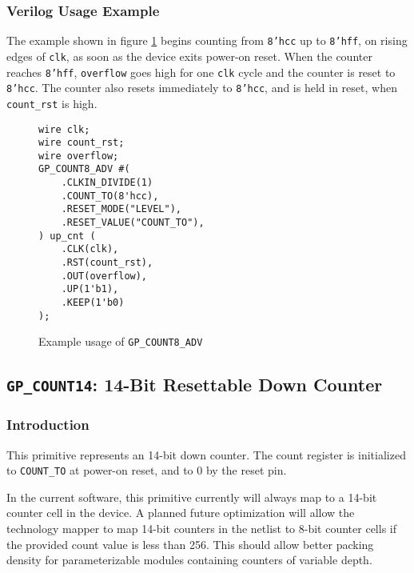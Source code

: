 \documentclass[11pt]{article}
\newcommand{\tokenstyle}[1]{\texttt{#1}}
\newcommand{\wirestyle}[1]{\texttt{#1}}
\newcommand{\datastyle}[1]{\texttt{#1}}
\begin{document}
\subsubsection{Verilog Usage Example}

The example shown in figure \ref{gp-count8-adv-example} begins counting from \datastyle{8'hcc} up to \datastyle{8'hff},
on rising edges of \wirestyle{clk}, as soon as the device exits power-on reset.
When the counter reaches \datastyle{8'hff}, \wirestyle{overflow} goes high for one \wirestyle{clk} cycle and
the counter is reset to \datastyle{8'hcc}. The counter also resets immediately to \datastyle{8'hcc}, and is held
in reset,  when \wirestyle{count\_rst} is high.

\begin{figure}[h]
\begin{lstlisting}
wire clk;
wire count_rst;
wire overflow;
GP_COUNT8_ADV #(
	.CLKIN_DIVIDE(1)
	.COUNT_TO(8'hcc),
	.RESET_MODE("LEVEL"),
	.RESET_VALUE("COUNT_TO"),
) up_cnt (
	.CLK(clk),
	.RST(count_rst),
	.OUT(overflow),
	.UP(1'b1),
	.KEEP(1'b0)
);
\end{lstlisting}
\caption{Example usage of \tokenstyle{GP\_COUNT8\_ADV}}
\label{gp-count8-adv-example}
\end{figure}


\pagebreak
\subsection{\tokenstyle{GP\_COUNT14}: 14-Bit Resettable Down Counter}
\label{gp-count14}

\subsubsection{Introduction}
This primitive represents an 14-bit down counter. The count register is initialized to \tokenstyle{COUNT\_TO} at
power-on reset, and to 0 by the reset pin.

In the current software, this primitive currently will always map to a 14-bit counter cell in the device. A planned
future optimization will allow the technology mapper to map 14-bit counters in the netlist to 8-bit counter cells if
the provided count value is less than 256. This should allow better packing density for parameterizable modules
containing counters of variable depth.
\end{document}

